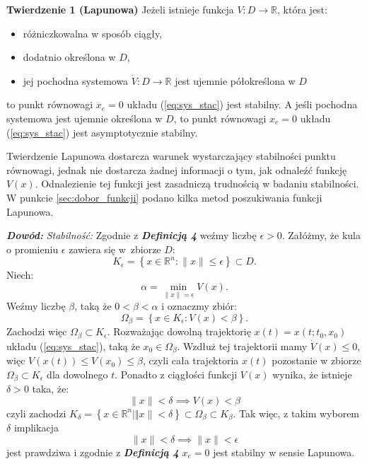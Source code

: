 \documentclass{article}
\begin{document}
\textbf{Twierdzenie 1 (Lapunowa)}
Jeżeli istnieje funkcja $V: D \rightarrow \mathbb{R}$, która jest:
\begin{itemize}
    \item różniczkowalna w sposób ciągły,
    \item dodatnio określona w $D$,
    \item jej pochodna systemowa $\dot{V}:D\rightarrow \mathbb{R}$ jest ujemnie półokreślona w $D$
\end{itemize}
to punkt równowagi $x_{e} = 0$ układu (\ref{eq:sys_stac}) jest stabilny.
A jeśli pochodna systemowa jest ujemnie określona w $D$, to punkt równowagi $x_{e} = 0$ układu (\ref{eq:sys_stac}) jest asymptotycznie stabilny.

\begin{tcolorbox}[colback=blue!5, colframe=blue!75!black, title=Ważne]
Twierdzenie Lapunowa dostarcza warunek wystarczający stabilności punktu równowagi, jednak nie dostarcza żadnej informacji o tym, jak odnaleźć funkcję $V(x)$. Odnalezienie tej funkcji jest zasadniczą trudnością w badaniu stabilności.
W punkcie \ref{sec:dobor_funkcji} podano kilka metod poszukiwania funkcji Lapunowa.
\end{tcolorbox}

\textbf{\textit{Dowód:}}
\textit{Stabilność:}
Zgodnie z \textbf{\textit{Definicją 4}} weźmy liczbę $\epsilon > 0$.
Załóżmy, że kula o promieniu $\epsilon$ zawiera się w~zbiorze $D$:
$$
    K_{\epsilon} = \left\{ x\in \mathbb{R}^{n}: \lVert x \rVert \leq \epsilon \right\} \subset D.
$$
Niech:
$$
    \alpha = \min_{\lVert x \rVert = \epsilon }V(x).
$$
Weźmy liczbę $\beta$, taką że $0 < \beta < \alpha$ i oznaczmy zbiór:
$$
    \Omega_{\beta} = \left\{ x \in K_{\epsilon}: V(x) < \beta \right\}.
$$
Zachodzi więc $\Omega_{\beta} \subset K_{\epsilon}$.
Rozważając dowolną trajektorię $x(t) = x(t; t_{0}, x_{0})$ układu (\ref{eq:sys_stac}), taką że $x_{0} \in \Omega_{\beta}$.
Wzdłuż tej trajektorii mamy $\dot{V}(x) \leq 0$, więc $V(x(t)) \leq V(x_{0}) \leq \beta$, czyli cała trajektoria $x(t)$ pozostanie w zbiorze $\Omega_{\beta} \subset K_{\epsilon}$ dla dowolnego $t$.
Ponadto z ciągłości funkcji $V(x)$ wynika, że istnieje $\delta > 0$ taka, że:
$$
    \lVert x \rVert < \delta \implies V(x) < \beta
$$
czyli zachodzi $K_{\delta} = \left\{ x \in \mathbb{R}^{n}| \Vert x \rVert < \delta \right\} \subset \Omega_{\beta} \subset K_{\beta}$. Tak więc, z takim wyborem $\delta$ implikacja
$$
    \lVert x \rVert < \delta \implies \lVert x \rVert < \epsilon
$$
jest prawdziwa i zgodnie z \textbf{\textit{Definicją 4}} $x_{e} = 0$ jest stabilny w sensie Lapunowa.
\end{document}
